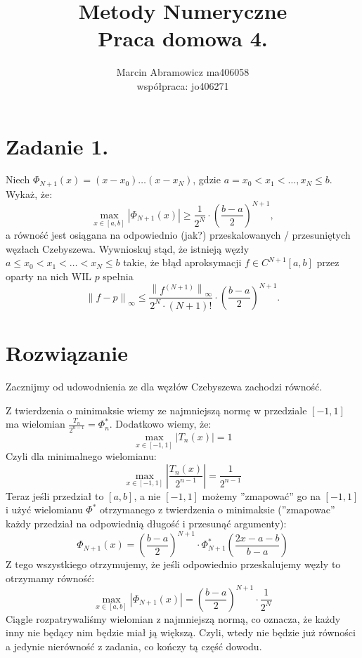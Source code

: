 \documentclass[a4paper]{article}
\title{\vspace{-1cm}
Metody Numeryczne \\
\large Praca domowa 4.
}
\author{
   Marcin Abramowicz ma406058 \\
   \small współpraca: jo406271
}
\renewcommand{\le}{\leqslant} %
\renewcommand{\ge}{\geqslant} %
\begin{document}
   \maketitle

   \section*{Zadanie 1.}

   Niech $\Phi_{N+1}(x) = (x - x_{0}) \dots (x - x_{N})$, gdzie $a = x_{0} < x_{1} < \dots, x_{N} \le b$.
   Wykaż, że:
   \[
      \max_{x \in [a, b]} \left| \Phi_{N+1}(x) \right| \ge \frac{1}{2^{N}} \cdot \left( \frac{b - a}{2} \right)^{N+1},
   \]
   a równość jest osiągana na odpowiednio (jak?) przeskalowanych / przesuniętych węzłach Czebyszewa.
   Wywnioskuj stąd, że istnieją węzły $a \le x_{0} < x_{1} < \dots < x_{N} \le b$ takie,
   że błąd aproksymacji $f \in C^{N+1}[a, b]$ przez oparty na nich WIL $p$ spełnia
   \[
      \left\| f - p \right\|_{\infty} \le
      \frac{\left\| f^{(N+1)} \right\|_{\infty}}{2^{N} \cdot (N + 1)!} \cdot
      \left( \frac{b - a}{2} \right)^{N+1}.
   \]


   \section*{\large Rozwiązanie}

   Zacznijmy od udowodnienia ze dla węzłów Czebyszewa zachodzi równość.

   Z twierdzenia o minimaksie wiemy ze najmniejszą normę w przedziale $[-1, 1]$
   ma wielomian $\frac{T_{n}}{2^{n-1}} = \Phi^{*}_{n}$.
   Dodatkowo wiemy, że:
   \[
      \max_{x \in [-1, 1]} \left| T_{n}(x) \right| = 1
   \]
   Czyli dla minimalnego wielomianu:
   \[
      \max_{x \in [-1, 1]} \left| \frac{T_{n}(x)}{2^{n-1}} \right| = \frac{1}{2^{n-1}}
   \]
   Teraz jeśli przedział to $[a, b]$, a nie $[-1, 1]$ możemy ''zmapować'' go na $[-1, 1]$ i użyć wielomianu $\Phi^{*}$ otrzymanego z twierdzenia o minimaksie
   (''zmapowac'' każdy przedział na odpowiednią długość i przesunąć argumenty):
   \[
      \Phi_{N+1}(x) = \left( \frac{b - a}{2} \right)^{N + 1} \cdot \Phi^{*}_{N+1} \left( \frac{2x - a - b}{b - a} \right)
   \]
   Z tego wszystkiego otrzymujemy, że jeśli odpowiednio przeskalujemy węzły to otrzymamy równość:
   \[
      \max_{x \in [a, b]} \left| \Phi_{N+1}(x) \right| =
      \left( \frac{b - a}{2} \right)^{N + 1} \cdot \frac{1}{2^{N}}
   \]
   Ciągle rozpatrywaliśmy wielomian z najmniejszą normą, co oznacza, że każdy inny nie będący nim będzie miał ją większą.
   Czyli, wtedy nie będzie już równości a jedynie nierówność z zadania, co kończy tą część dowodu. \\
   \\
\end{document}
